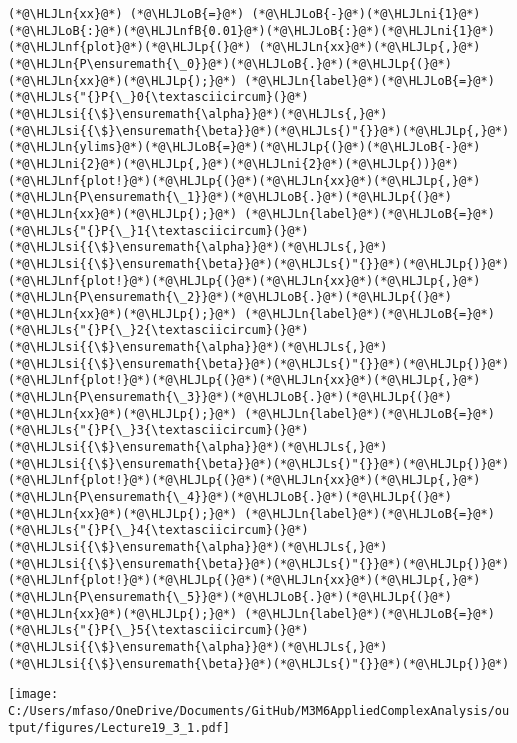 \documentclass[12pt,a4paper]{article}
\newcommand{\HLJLn}[1]{#1}
\newcommand{\HLJLnf}[1]{\textcolor[RGB]{66,102,213}{#1}}
\newcommand{\HLJLs}[1]{\textcolor[RGB]{201,61,57}{#1}}
\newcommand{\HLJLsi}[1]{#1}
\newcommand{\HLJLnfB}[1]{\textcolor[RGB]{59,151,46}{#1}}
\newcommand{\HLJLni}[1]{\textcolor[RGB]{59,151,46}{#1}}
\newcommand{\HLJLoB}[1]{\textcolor[RGB]{102,102,102}{\textbf{#1}}}
\newcommand{\HLJLp}[1]{#1}
\begin{document}
\begin{lstlisting}
(*@\HLJLn{xx}@*) (*@\HLJLoB{=}@*) (*@\HLJLoB{-}@*)(*@\HLJLni{1}@*)(*@\HLJLoB{:}@*)(*@\HLJLnfB{0.01}@*)(*@\HLJLoB{:}@*)(*@\HLJLni{1}@*)
(*@\HLJLnf{plot}@*)(*@\HLJLp{(}@*) (*@\HLJLn{xx}@*)(*@\HLJLp{,}@*) (*@\HLJLn{P\ensuremath{\_0}}@*)(*@\HLJLoB{.}@*)(*@\HLJLp{(}@*)(*@\HLJLn{xx}@*)(*@\HLJLp{);}@*) (*@\HLJLn{label}@*)(*@\HLJLoB{=}@*)(*@\HLJLs{"{}P{\_}0{\textasciicircum}(}@*)(*@\HLJLsi{{\$}\ensuremath{\alpha}}@*)(*@\HLJLs{,}@*)(*@\HLJLsi{{\$}\ensuremath{\beta}}@*)(*@\HLJLs{)"{}}@*)(*@\HLJLp{,}@*) (*@\HLJLn{ylims}@*)(*@\HLJLoB{=}@*)(*@\HLJLp{(}@*)(*@\HLJLoB{-}@*)(*@\HLJLni{2}@*)(*@\HLJLp{,}@*)(*@\HLJLni{2}@*)(*@\HLJLp{))}@*)
(*@\HLJLnf{plot!}@*)(*@\HLJLp{(}@*)(*@\HLJLn{xx}@*)(*@\HLJLp{,}@*) (*@\HLJLn{P\ensuremath{\_1}}@*)(*@\HLJLoB{.}@*)(*@\HLJLp{(}@*)(*@\HLJLn{xx}@*)(*@\HLJLp{);}@*) (*@\HLJLn{label}@*)(*@\HLJLoB{=}@*)(*@\HLJLs{"{}P{\_}1{\textasciicircum}(}@*)(*@\HLJLsi{{\$}\ensuremath{\alpha}}@*)(*@\HLJLs{,}@*)(*@\HLJLsi{{\$}\ensuremath{\beta}}@*)(*@\HLJLs{)"{}}@*)(*@\HLJLp{)}@*)
(*@\HLJLnf{plot!}@*)(*@\HLJLp{(}@*)(*@\HLJLn{xx}@*)(*@\HLJLp{,}@*) (*@\HLJLn{P\ensuremath{\_2}}@*)(*@\HLJLoB{.}@*)(*@\HLJLp{(}@*)(*@\HLJLn{xx}@*)(*@\HLJLp{);}@*) (*@\HLJLn{label}@*)(*@\HLJLoB{=}@*)(*@\HLJLs{"{}P{\_}2{\textasciicircum}(}@*)(*@\HLJLsi{{\$}\ensuremath{\alpha}}@*)(*@\HLJLs{,}@*)(*@\HLJLsi{{\$}\ensuremath{\beta}}@*)(*@\HLJLs{)"{}}@*)(*@\HLJLp{)}@*)
(*@\HLJLnf{plot!}@*)(*@\HLJLp{(}@*)(*@\HLJLn{xx}@*)(*@\HLJLp{,}@*) (*@\HLJLn{P\ensuremath{\_3}}@*)(*@\HLJLoB{.}@*)(*@\HLJLp{(}@*)(*@\HLJLn{xx}@*)(*@\HLJLp{);}@*) (*@\HLJLn{label}@*)(*@\HLJLoB{=}@*)(*@\HLJLs{"{}P{\_}3{\textasciicircum}(}@*)(*@\HLJLsi{{\$}\ensuremath{\alpha}}@*)(*@\HLJLs{,}@*)(*@\HLJLsi{{\$}\ensuremath{\beta}}@*)(*@\HLJLs{)"{}}@*)(*@\HLJLp{)}@*)
(*@\HLJLnf{plot!}@*)(*@\HLJLp{(}@*)(*@\HLJLn{xx}@*)(*@\HLJLp{,}@*) (*@\HLJLn{P\ensuremath{\_4}}@*)(*@\HLJLoB{.}@*)(*@\HLJLp{(}@*)(*@\HLJLn{xx}@*)(*@\HLJLp{);}@*) (*@\HLJLn{label}@*)(*@\HLJLoB{=}@*)(*@\HLJLs{"{}P{\_}4{\textasciicircum}(}@*)(*@\HLJLsi{{\$}\ensuremath{\alpha}}@*)(*@\HLJLs{,}@*)(*@\HLJLsi{{\$}\ensuremath{\beta}}@*)(*@\HLJLs{)"{}}@*)(*@\HLJLp{)}@*)
(*@\HLJLnf{plot!}@*)(*@\HLJLp{(}@*)(*@\HLJLn{xx}@*)(*@\HLJLp{,}@*) (*@\HLJLn{P\ensuremath{\_5}}@*)(*@\HLJLoB{.}@*)(*@\HLJLp{(}@*)(*@\HLJLn{xx}@*)(*@\HLJLp{);}@*) (*@\HLJLn{label}@*)(*@\HLJLoB{=}@*)(*@\HLJLs{"{}P{\_}5{\textasciicircum}(}@*)(*@\HLJLsi{{\$}\ensuremath{\alpha}}@*)(*@\HLJLs{,}@*)(*@\HLJLsi{{\$}\ensuremath{\beta}}@*)(*@\HLJLs{)"{}}@*)(*@\HLJLp{)}@*)
\end{lstlisting}

\texttt{[image: C:/Users/mfaso/OneDrive/Documents/GitHub/M3M6AppliedComplexAnalysis/output/figures/Lecture19\_3\_1.pdf]}
\end{document}

